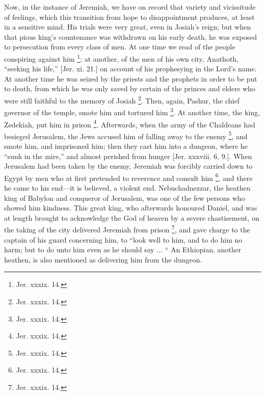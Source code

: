 Now, in the instance of Jeremiah, we have on record that variety
and vicissitude of feelings, which this transition from hope to
disappointment produces, at least in a sensitive mind. His trials were
very great, even in Josiah's reign; but when that pious king's
countenance was withdrawn on his early death, he was exposed to
persecution from every class of men. At one time we read of the people
conspiring against him \footnote{Jer. xxxix. 14.}; at another, of the men of
his own city, Anathoth, ``seeking his life,'' [Jer. xi. 21.]
on account of his prophesying in the Lord's name. At another time he
was seized by the priests and the prophets in order to be put to
death, from which he was only saved by certain of the princes and
elders who were still faithful to the memory of Josiah \footnote{Jer. xxxix. 14.}. Then, again, Pashur, the chief governor of the temple, smote
him and tortured him \footnote{Jer. xxxix. 14.}. At another time, the king,
Zedekiah, put him in prison \footnote{Jer. xxxix. 14.}. Afterwards, when the
army of the Chaldeans had besieged Jerusalem, the Jews accused him of
falling away to the enemy \footnote{Jer. xxxix. 14.}, and smote him, and
imprisoned him; then they cast him into a dungeon, where he ``sunk
in the mire,'' and almost perished from hunger [Jer. xxxviii. 6,
9.]. When Jerusalem had been taken by the enemy, Jeremiah was forcibly
carried down to Egypt by men who at first pretended to reverence and
consult him \footnote{Jer. xxxix. 14.}, and there he came to his end—it is
believed, a violent end. Nebuchadnezzar, the heathen king of Babylon
and conqueror of Jerusalem, was one of the few persons who showed him
kindness. This great king, who afterwards honoured Daniel, and was at
length brought to acknowledge the God of heaven by a severe
chastisement, on the taking of the city delivered Jeremiah from prison
\footnote{Jer. xxxix. 14.}, and gave charge to the captain of his guard
concerning him, to ``look well to him, and to do him no harm; but
to do unto him even as he should say ... `` An Ethiopian, another
heathen, is also mentioned as delivering him from the dungeon.

